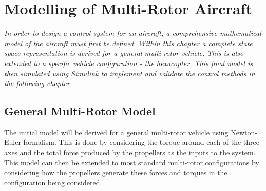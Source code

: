 
\chapter{Modelling of Multi-Rotor Aircraft}\label{chapter:Modelling}
\textit{In order to design a control system for an aircraft, a comprehensive mathematical model of the aircraft must first be defined. Within this chapter a complete state space representation is derived for a general multi-rotor vehicle. This is also extended to a specific vehicle configuration - the hexacopter. This final model is then simulated using Simulink to implement and validate the control methods in the following chapter.}

\section{General Multi-Rotor Model}\label{section:MultiRotorModel}
The initial model will be derived for a general multi-rotor vehicle using Newton-Euler formalism. This is done by considering the torque around each of the three axes and the total force produced by the propellers as the inputs to the system. This model can then be extended to most standard multi-rotor configurations by considering how the propellers generate these forces and torques in the configuration being considered.


